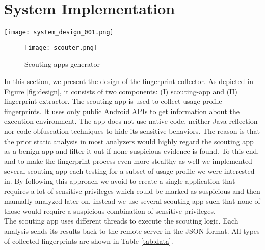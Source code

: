 \section{System Implementation}
\label{sec:design}

\begin{figure*}[h!]
\centering
\texttt{[image: system\_design\_001.png]}
\caption{The design of fingerprint collector}
\label{fig:design}
\end{figure*}

\begin{figure}[h!]
\centering
\texttt{[image: scouter.png]}
\caption{Scouting apps generator}
\label{fig:scouter}
\end{figure}

In this section, we present the design of the fingerprint collector. As depicted in Figure \ref{fig:design}, it consists of two components: (I) scouting-app and (II) fingerprint extractor. The scouting-app is used to collect usage-profile fingerprints. It uses only public Android APIs to get information about the execution environment. The app does not use native code, neither Java reflection nor code obfuscation techniques to hide its sensitive behaviors. The reason is that the prior static analysis in most analyzers would highly regard the scouting app as a benign app and filter it out if none suspicious evidence is found. To this end, and to make the fingerprint process even more stealthy as well we implemented several scouting-app each testing for a subset of usage-profile we were interested in. By following this approach we avoid to create a single application that requires a lot of sensitive privileges which could be marked as suspicious and then manually analyzed later on, instead we use several scouting-app such that none of those would require a suspicious combination of sensitive privileges.  \\
The scouting app uses different threads to execute the scouting logic. Each analysis sends its results back to the remote server in the JSON format. All types of collected fingerprints are shown in Table \ref{tab:data}. \\

